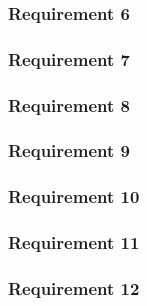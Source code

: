 \subsubsection*{Requirement 6}

\subsubsection*{Requirement 7}

\subsubsection*{Requirement 8}

\subsubsection*{Requirement 9}

\subsubsection*{Requirement 10}

\subsubsection*{Requirement 11}

\subsubsection*{Requirement 12}














